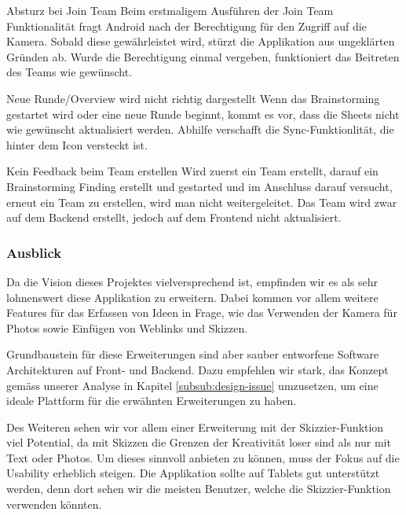\begin{basedescript}{
		\desclabelstyle{\multilinelabel}
		\desclabelwidth{4.5cm}
		\setlength{\itemsep}{5ex}}
	\item [Absturz bei Join Team] Beim erstmaligem Ausführen der Join Team Funktionalität fragt Android nach der Berechtigung für den Zugriff auf die Kamera. Sobald diese gewährleistet wird, stürzt die Applikation aus ungeklärten Gründen ab. Wurde die Berechtigung einmal vergeben, funktioniert das Beitreten des Teams wie gewünscht.
	
	\item [Neue Runde/Overview wird nicht richtig dargestellt] 
	Wenn das Brainstorming gestartet wird oder eine neue Runde beginnt, kommt es vor, dass die Sheets nicht wie gewünscht aktualisiert werden. Abhilfe verschafft die Sync-Funktionlität, die hinter dem Icon versteckt ist.
	
	\item [Kein Feedback beim Team erstellen] 
	Wird zuerst ein Team erstellt, darauf ein Brainstorming Finding erstellt und gestarted und im Anschluss darauf versucht, erneut ein Team zu erstellen, wird man nicht weitergeleitet. Das Team wird zwar auf dem Backend erstellt, jedoch auf dem Frontend nicht aktualisiert.
\end{basedescript}


\subsubsection{Ausblick}
\label{subsub:Ausblick}

Da die Vision dieses Projektes vielversprechend ist, empfinden wir es als sehr lohnenswert diese Applikation zu erweitern. Dabei kommen vor allem weitere Features für das Erfassen von Ideen in Frage, wie das Verwenden der Kamera für Photos sowie  Einfügen von Weblinks und Skizzen.

Grundbaustein für diese Erweiterungen sind aber sauber entworfene Software Architekturen auf Front- und Backend. Dazu empfehlen wir stark, das Konzept gemäss unserer Analyse in Kapitel \ref{subsub:design-issue} umzusetzen, um eine ideale Plattform für die erwähnten Erweiterungen zu haben. 

Des Weiteren sehen wir vor allem einer Erweiterung mit der Skizzier-Funktion viel Potential, da mit Skizzen die Grenzen der Kreativität loser sind als nur mit Text oder Photos. Um dieses sinnvoll anbieten zu können, muss der Fokus auf die Usability erheblich steigen. Die Applikation sollte auf Tablets gut unterstützt werden, denn dort sehen wir die meisten Benutzer, welche die Skizzier-Funktion verwenden könnten. 

